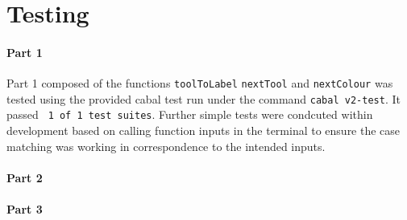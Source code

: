 \documentclass[11pt]{article}
\begin{document}
\section{Testing}%
\paragraph{Part 1}
Part 1 composed of the functions \verb|toolToLabel| \verb|nextTool| and \verb|nextColour| was tested using the provided cabal test run under the command \verb|cabal v2-test|. It passed \verb| 1 of 1 test suites|. Further simple tests were condcuted within development based on calling function inputs in the terminal to ensure the case matching was working in correspondence to the intended inputs.
\paragraph{Part 2} 

\paragraph{Part 3}



\end{document}
